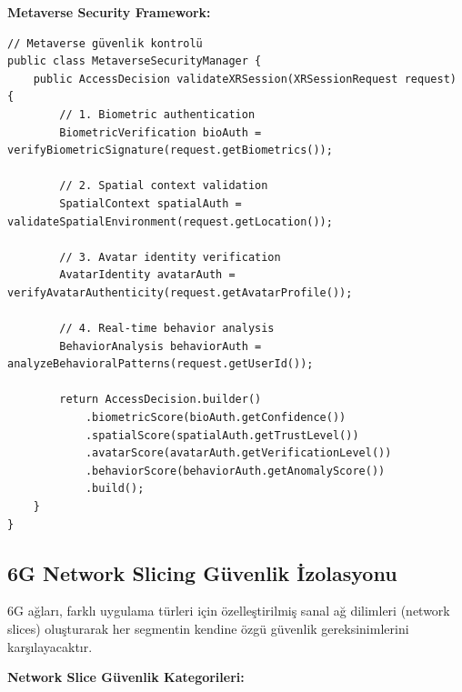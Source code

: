 \textbf{Metaverse Security Framework:}
\begin{lstlisting}[breaklines=true,basicstyle=\ttfamily\footnotesize]
// Metaverse güvenlik kontrolü
public class MetaverseSecurityManager {
    public AccessDecision validateXRSession(XRSessionRequest request) {
        // 1. Biometric authentication
        BiometricVerification bioAuth = verifyBiometricSignature(request.getBiometrics());
        
        // 2. Spatial context validation
        SpatialContext spatialAuth = validateSpatialEnvironment(request.getLocation());
        
        // 3. Avatar identity verification
        AvatarIdentity avatarAuth = verifyAvatarAuthenticity(request.getAvatarProfile());
        
        // 4. Real-time behavior analysis
        BehaviorAnalysis behaviorAuth = analyzeBehavioralPatterns(request.getUserId());
        
        return AccessDecision.builder()
            .biometricScore(bioAuth.getConfidence())
            .spatialScore(spatialAuth.getTrustLevel())
            .avatarScore(avatarAuth.getVerificationLevel())
            .behaviorScore(behaviorAuth.getAnomalyScore())
            .build();
    }
}
\end{lstlisting}

\subsection{6G Network Slicing Güvenlik İzolasyonu}

6G ağları, farklı uygulama türleri için özelleştirilmiş sanal ağ dilimleri (network slices) oluşturarak her segmentin kendine özgü güvenlik gereksinimlerini karşılayacaktır.

\textbf{Network Slice Güvenlik Kategorileri:}
